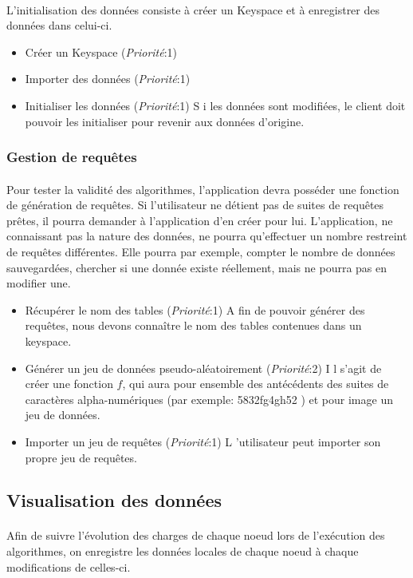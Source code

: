 \documentclass[12pt]{article}
\newenvironment{besoins}
{ \begin{itemize}[topsep=20pt]   }
{ \end{itemize}                  }
\newcommand{\priority}[1] {
  (\textit{Priorité}:#1)
}
\newcommand{\besoin}[3]{
	\item #1 \priority{#2} #3
}
\begin{document}
\paragraph{} L'initialisation des données consiste à créer un Keyspace et à enregistrer des données dans celui-ci.

\begin{besoins}
	\besoin{Créer un Keyspace}{1}
	\besoin{Importer des données}{1}
	\besoin{Initialiser les données}{1} Si les données sont modifiées, le client doit pouvoir les initialiser pour revenir aux données d'origine.
\end{besoins}

\subsubsection{Gestion de requêtes}

\paragraph{} Pour tester la validité des algorithmes, l'application devra posséder une fonction de génération de requêtes. 
Si l'utilisateur ne détient pas de suites de requêtes prêtes, il pourra demander à l'application d'en créer pour lui. 
L'application, ne connaissant pas la nature des données, ne pourra qu'effectuer un nombre restreint de requêtes différentes. 
Elle pourra par exemple, compter le nombre de données sauvegardées, chercher si une donnée existe réellement, mais ne pourra pas en modifier une.

\begin{besoins}
  	\besoin{Récupérer le nom des tables}{1} Afin de pouvoir générer des requêtes, nous devons connaître le nom des tables contenues dans un keyspace.
	\besoin{Générer un jeu de données pseudo-aléatoirement}{2} Il s'agit de créer une fonction $f$, qui aura pour ensemble des antécédents des suites de caractères alpha-numériques (par exemple: 5832fg4gh52 ) et pour image un jeu de données.
	\besoin{Importer un jeu de requêtes}{1} L'utilisateur peut importer son propre jeu de requêtes.
\end{besoins}


\subsection{Visualisation des données}

\paragraph{} Afin de suivre l'évolution des charges de chaque noeud lors de l'exécution des algorithmes, on enregistre les données locales de chaque noeud à chaque modifications de celles-ci.
\end{document}
